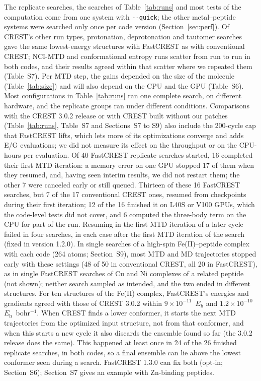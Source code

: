 \documentclass[journal=jctcce,manuscript=article]{achemso}
\newcommand{\Eh}{\ensuremath{E_\mathrm{h}}}
\newcommand{\quickflag}{\texttt{-{}-quick}}
\begin{document}
The replicate searches, the searches of Table~\ref{tab:runs} and most tests of the computation come from one system with \quickflag; the other metal--peptide systems were searched only once per code version (Section~\ref{sec:perf}). Of CREST's other run types, protonation, deprotonation and tautomer searches gave the same lowest-energy structures with FastCREST as with conventional CREST; NCI-MTD and conformational entropy runs scatter from run to run in both codes, and their results agreed within that scatter where we repeated them (Table~S7). Per MTD step, the gains depended on the size of the molecule (Table~\ref{tab:size}) and will also depend on the CPU and the GPU (Table~S6). Most configurations in Table~\ref{tab:runs} ran one complete search, on different hardware, and the replicate groups ran under different conditions. Comparisons with the CREST 3.0.2 release or with CREST built without our patches (Table~\ref{tab:runs}, Table~S7 and Sections~S7 to S9) also include the 200-cycle cap that FastCREST lifts, which lets more of its optimizations converge and adds E/G evaluations; we did not measure its effect on the throughput or on the CPU-hours per evaluation. Of 40 FastCREST replicate searches started, 16 completed their first MTD iteration: a memory error on one GPU stopped 17 of them when they resumed, and, having seen interim results, we did not restart them; the other 7 were canceled early or still queued. Thirteen of these 16 FastCREST searches, but 7 of the 17 conventional CREST ones, resumed from checkpoints during their first iteration; 12 of the 16 finished it on L40S or V100 GPUs, which the code-level tests did not cover, and 6 computed the three-body term on the CPU for part of the run. Resuming in the first MTD iteration of a later cycle failed in four searches, in each case after the first MTD iteration of the search (fixed in version 1.2.0). In single searches of a high-spin Fe(II)--peptide complex with each code (264 atoms; Section~S9), most MTD and MD trajectories stopped early with these settings (48 of 50 in conventional CREST, all 20 in FastCREST), as in single FastCREST searches of Cu and Ni complexes of a related peptide (not shown); neither search sampled as intended, and the two ended in different structures. For ten structures of the Fe(II) complex, FastCREST's energies and gradients agreed with those of CREST 3.0.2 within $9\times10^{-11}$~\Eh{} and $1.2\times10^{-10}$~\Eh~bohr$^{-1}$. When CREST finds a lower conformer, it starts the next MTD trajectories from the optimized input structure, not from that conformer, and when this starts a new cycle it also discards the ensemble found so far (the 3.0.2 release does the same). This happened at least once in 24 of the 26 finished replicate searches, in both codes, so a final ensemble can lie above the lowest conformer seen during a search. FastCREST 1.3.0 can fix both (opt-in; Section~S6); Section~S7 gives an example with Zn-binding peptides.
\end{document}
